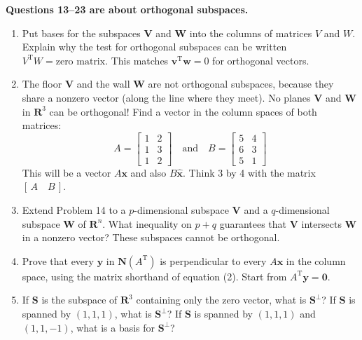 \documentclass[14pt, a4paper]{article}
\begin{document}
\noindent \textbf{Questions 13--23 are about orthogonal subspaces.}

\begin{enumerate}[resume]
    \item Put bases for the subspaces $\mathbf{V}$ and $\mathbf{W}$ into the columns of matrices $V$ and $W$. Explain why the test for orthogonal subspaces can be written $V^{\mathrm{T}}W = \text{zero matrix}$. This matches $\boldsymbol{v}^{\mathrm{T}}\boldsymbol{w} = 0$ for orthogonal vectors.

    \item The floor $\mathbf{V}$ and the wall $\mathbf{W}$ are not orthogonal subspaces, because they share a nonzero vector (along the line where they meet). No planes $\mathbf{V}$ and $\mathbf{W}$ in $\mathbf{R}^3$ can be orthogonal! Find a vector in the column spaces of both matrices:
          \[
              A = \begin{bmatrix} 1 & 2 \\ 1 & 3 \\ 1 & 2 \end{bmatrix} \quad \text{and} \quad
              B = \begin{bmatrix} 5 & 4 \\ 6 & 3 \\ 5 & 1 \end{bmatrix}
          \]
          This will be a vector $A\boldsymbol{x}$ and also $B\widehat{\boldsymbol{x}}$. Think 3 by 4 with the matrix $[\, A \quad B \,]$.

    \item Extend Problem 14 to a $p$-dimensional subspace $\mathbf{V}$ and a $q$-dimensional subspace $\mathbf{W}$ of $\mathbf{R}^n$. What inequality on $p+q$ guarantees that $\mathbf{V}$ intersects $\mathbf{W}$ in a nonzero vector? These subspaces cannot be orthogonal.

    \item Prove that every $\boldsymbol{y}$ in $\mathbf{N}(A^{\mathrm{T}})$ is perpendicular to every $A\boldsymbol{x}$ in the column space, using the matrix shorthand of equation (2). Start from $A^{\mathrm{T}}\boldsymbol{y} = \boldsymbol{0}$.

    \item If $\mathbf{S}$ is the subspace of $\mathbf{R}^3$ containing only the zero vector, what is $\mathbf{S}^{\perp}$? If $\mathbf{S}$ is spanned by $(1, 1, 1)$, what is $\mathbf{S}^{\perp}$? If $\mathbf{S}$ is spanned by $(1, 1, 1)$ and $(1, 1, -1)$, what is a basis for $\mathbf{S}^{\perp}$?


\end{enumerate}
\end{document}
